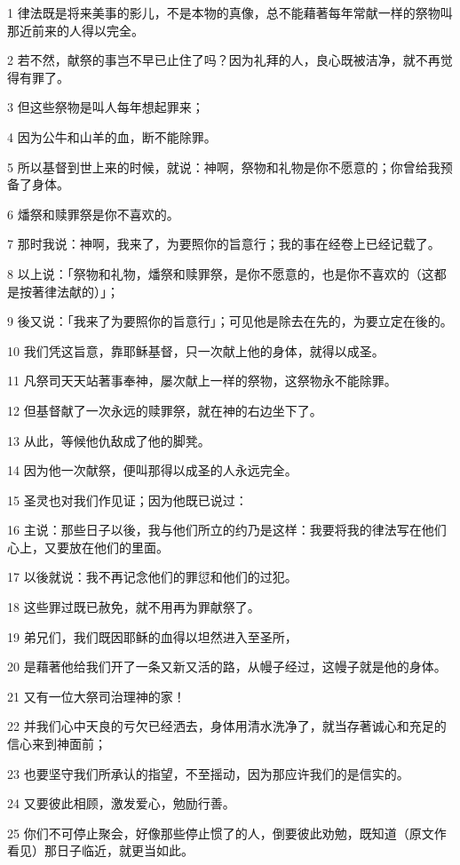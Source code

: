 \par 1 律法既是将来美事的影儿，不是本物的真像，总不能藉著每年常献一样的祭物叫那近前来的人得以完全。
\par 2 若不然，献祭的事岂不早已止住了吗？因为礼拜的人，良心既被洁净，就不再觉得有罪了。
\par 3 但这些祭物是叫人每年想起罪来；
\par 4 因为公牛和山羊的血，断不能除罪。
\par 5 所以基督到世上来的时候，就说：神啊，祭物和礼物是你不愿意的；你曾给我预备了身体。
\par 6 燔祭和赎罪祭是你不喜欢的。
\par 7 那时我说：神啊，我来了，为要照你的旨意行；我的事在经卷上已经记载了。
\par 8 以上说：「祭物和礼物，燔祭和赎罪祭，是你不愿意的，也是你不喜欢的（这都是按著律法献的）」；
\par 9 後又说：「我来了为要照你的旨意行」；可见他是除去在先的，为要立定在後的。
\par 10 我们凭这旨意，靠耶稣基督，只一次献上他的身体，就得以成圣。
\par 11 凡祭司天天站著事奉神，屡次献上一样的祭物，这祭物永不能除罪。
\par 12 但基督献了一次永远的赎罪祭，就在神的右边坐下了。
\par 13 从此，等候他仇敌成了他的脚凳。
\par 14 因为他一次献祭，便叫那得以成圣的人永远完全。
\par 15 圣灵也对我们作见证；因为他既已说过：
\par 16 主说：那些日子以後，我与他们所立的约乃是这样：我要将我的律法写在他们心上，又要放在他们的里面。
\par 17 以後就说：我不再记念他们的罪愆和他们的过犯。
\par 18 这些罪过既已赦免，就不用再为罪献祭了。
\par 19 弟兄们，我们既因耶稣的血得以坦然进入至圣所，
\par 20 是藉著他给我们开了一条又新又活的路，从幔子经过，这幔子就是他的身体。
\par 21 又有一位大祭司治理神的家！
\par 22 并我们心中天良的亏欠已经洒去，身体用清水洗净了，就当存著诚心和充足的信心来到神面前；
\par 23 也要坚守我们所承认的指望，不至摇动，因为那应许我们的是信实的。
\par 24 又要彼此相顾，激发爱心，勉励行善。
\par 25 你们不可停止聚会，好像那些停止惯了的人，倒要彼此劝勉，既知道（原文作看见）那日子临近，就更当如此。
